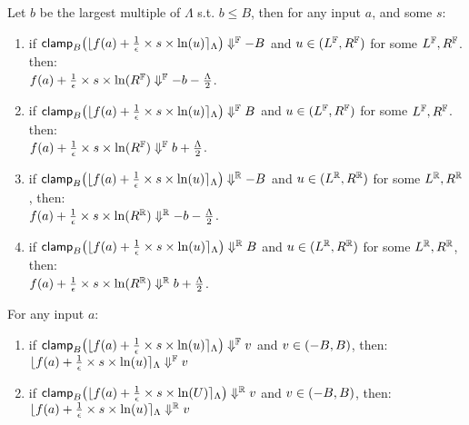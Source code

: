 \documentclass[a4paper,11pt]{article}
\begin{document}
\begin{lem}[clampR]
\label{lem:clampr}
Let $b$ be the largest multiple of $\Lambda$ s.t. $ b \leq B$, then for any input $a$, and some $s$:
\begin{enumerate}
\item 
if 
$\mathsf{clamp}_B \big(
	\lfloor f(a) + \frac{1}{\epsilon} \times s \times \ln (u) \rceil_{\Lambda}
	\big)
	\Downarrow^{\mathbb{F}} -B$ and $u \in (L^{\mathbb{F}}, R^{\mathbb{F}})$ for some $L^{\mathbb{F}}, R^{\mathbb{F}}$.
	 then:
	 \\
	$f(a) + \frac{1}{\epsilon} \times s \times \ln (R^{\mathbb{F}}) \Downarrow^{\mathbb{F}} -b - \frac{\Lambda}{2}$.
%
\item 
if 
$\mathsf{clamp}_B \big(
	\lfloor f(a) + \frac{1}{\epsilon} \times s \times \ln (u) \rceil_{\Lambda}
	\big)
	\Downarrow^{\mathbb{F}} B$ and $u \in (L^{\mathbb{F}}, R^{\mathbb{F}})$ for some $L^{\mathbb{F}}, R^{\mathbb{F}}$.
	 then:
	 \\
	$f(a) + \frac{1}{\epsilon} \times s \times \ln (R^{\mathbb{F}}) \Downarrow^{\mathbb{F}} b + \frac{\Lambda}{2}$.
%
\item
if
$\mathsf{clamp}_B \big(
	\lfloor f(a) + \frac{1}{\epsilon} \times s \times \ln (u) \rceil_{\Lambda}
	\big)
	\Downarrow^{\mathbb{R}} -B$ and $u \in (L^{\mathbb{R}}, R^{\mathbb{R}})$ for some $L^{\mathbb{R}}, R^{\mathbb{R}}$, then:
	 \\
	$f(a) + \frac{1}{\epsilon} \times s \times \ln (R^{\mathbb{R}}) \Downarrow^{\mathbb{R}} -b - \frac{\Lambda}{2}$.
%
\item
if
$\mathsf{clamp}_B \big(
	\lfloor f(a) + \frac{1}{\epsilon} \times s \times \ln (u) \rceil_{\Lambda}
	\big)
	\Downarrow^{\mathbb{R}} B$ and $u \in (L^{\mathbb{R}}, R^{\mathbb{R}})$ for some $L^{\mathbb{R}}, R^{\mathbb{R}}$, then:
	 \\
	$f(a) + \frac{1}{\epsilon} \times s \times \ln (R^{\mathbb{R}}) \Downarrow^{\mathbb{R}} b + \frac{\Lambda}{2}$.
%
\end{enumerate}
\end{lem}
%
%
\begin{lem}[clampId]
\label{lem:clampid}
For any input $a$:
\begin{enumerate}
\item 
if 
$\mathsf{clamp}_B \big(
	\lfloor f(a) + \frac{1}{\epsilon} \times s \times \ln (u) \rceil_{\Lambda}
	\big)
	\Downarrow^{\mathbb{F}} v$ and $v \in (-B, B)$, then:
	$\lfloor f(a) + \frac{1}{\epsilon} \times s \times \ln (u) \rceil_{\Lambda}
	\Downarrow^{\mathbb{F}} v$
%
\item
if
$\mathsf{clamp}_B \big(
	\lfloor f(a) + \frac{1}{\epsilon} \times s \times \ln (U) \rceil_{\Lambda}
	\big)
	\Downarrow^{\mathbb{R}} v$ and $v \in (-B, B)$, then:
	$\lfloor f(a) + \frac{1}{\epsilon} \times s \times \ln (u) \rceil_{\Lambda}
	\Downarrow^{\mathbb{R}} v$
\end{enumerate}
\end{lem}
\end{document}
